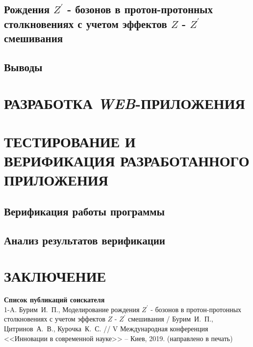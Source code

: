 \documentclass[12pt,a4paper]{styles/report}
\begin{document}
\section{Рождения $Z^\prime$ - бозонов в протон-протонных столкновениях с учетом эффектов $Z$ - $Z^\prime$ смешивания}


\section{Выводы}


\chapter{РАЗРАБОТКА \textit{WEB}-ПРИЛОЖЕНИЯ}


\chapter{ТЕСТИРОВАНИЕ И ВЕРИФИКАЦИЯ РАЗРАБОТАННОГО ПРИЛОЖЕНИЯ}
\section{Верификация работы программы}

\section{Анализ результатов верификации}


\newpage
\chapter*{ЗАКЛЮЧЕНИЕ}


\newpage
{}
\begin{thebibliography}{9999.}

\end{thebibliography}

\textbf{Список публикаций соискателя}\\

1-A. Бурим~И.~П., Моделирование рождения $Z^\prime$ - бозонов в протон-протонных столкновениях с учетом эффектов $Z$ - $Z^\prime$ смешивания / Бурим~И.~П., Цитринов~А.~В., Курочка~К.~С. // V Международная конференция <<Инновации в современной науке>> -- Киев, 2019. (направлено в печать)


\newpage

\end{document}
